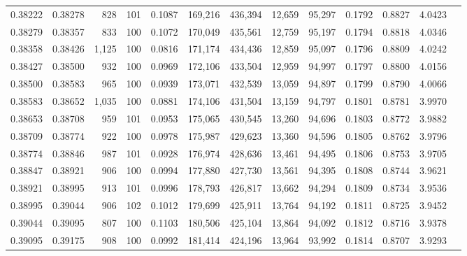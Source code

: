 \begin{tabular}{rrrrrrrrrrrrr}
0.38222 & 0.38278 &   828 & 101 &                                     0.1087 & 169,216 & 436,394 &  12,659 &  95,297 & 0.1792 & 0.8827 & 4.0423 \\
0.38279 & 0.38357 &   833 & 100 &                                     0.1072 & 170,049 & 435,561 &  12,759 &  95,197 & 0.1794 & 0.8818 & 4.0346 \\
0.38358 & 0.38426 & 1,125 & 100 &                                     0.0816 & 171,174 & 434,436 &  12,859 &  95,097 & 0.1796 & 0.8809 & 4.0242 \\
0.38427 & 0.38500 &   932 & 100 &                                     0.0969 & 172,106 & 433,504 &  12,959 &  94,997 & 0.1797 & 0.8800 & 4.0156 \\
0.38500 & 0.38583 &   965 & 100 &                                     0.0939 & 173,071 & 432,539 &  13,059 &  94,897 & 0.1799 & 0.8790 & 4.0066 \\
0.38583 & 0.38652 & 1,035 & 100 &                                     0.0881 & 174,106 & 431,504 &  13,159 &  94,797 & 0.1801 & 0.8781 & 3.9970 \\
0.38653 & 0.38708 &   959 & 101 &                                     0.0953 & 175,065 & 430,545 &  13,260 &  94,696 & 0.1803 & 0.8772 & 3.9882 \\
0.38709 & 0.38774 &   922 & 100 &                                     0.0978 & 175,987 & 429,623 &  13,360 &  94,596 & 0.1805 & 0.8762 & 3.9796 \\
0.38774 & 0.38846 &   987 & 101 &                                     0.0928 & 176,974 & 428,636 &  13,461 &  94,495 & 0.1806 & 0.8753 & 3.9705 \\
0.38847 & 0.38921 &   906 & 100 &                                     0.0994 & 177,880 & 427,730 &  13,561 &  94,395 & 0.1808 & 0.8744 & 3.9621 \\
0.38921 & 0.38995 &   913 & 101 &                                     0.0996 & 178,793 & 426,817 &  13,662 &  94,294 & 0.1809 & 0.8734 & 3.9536 \\
0.38995 & 0.39044 &   906 & 102 &                                     0.1012 & 179,699 & 425,911 &  13,764 &  94,192 & 0.1811 & 0.8725 & 3.9452 \\
0.39044 & 0.39095 &   807 & 100 &                                     0.1103 & 180,506 & 425,104 &  13,864 &  94,092 & 0.1812 & 0.8716 & 3.9378 \\
0.39095 & 0.39175 &   908 & 100 &                                     0.0992 & 181,414 & 424,196 &  13,964 &  93,992 & 0.1814 & 0.8707 & 3.9293 \\

\end{tabular}
